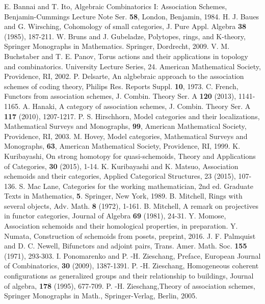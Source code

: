 \documentclass{amsart}
\theoremstyle{definition}
\theoremstyle{remark}
\begin{document}
\begin{thebibliography}{99}
%
 E. Bannai and T. Ito, Algebraic Combinatorics I: Association Schemes, Benjamin-Cummings Lecture Note Ser. {\bf 58}, 
London, Benjamin, 1984. 
%
 H. J. Baues and G. Wirsching,  
Cohomology of small categories, J. Pure Appl. Algebra {\bf 38} (1985), 187-211.
%
 W. Bruns and J. Gubeladze, Polytopes, rings, and K-theory, 
Springer Monographs in Mathematics. Springer, Dordrecht, 2009.
%
  V. M. Buchstaber and T. E.  Panov, 
Torus actions and their applications in topology and combinatorics. University Lecture Series, 24. 
American Mathematical Society, Providence, RI, 2002.
%
 P. Delsarte, An algbebraic approach to the association schemes of coding theory, 
Philips Res. Reports Suppl. {\bf 10}, 1973.  
%
 C. French, Functors from association schemes,  
J. Combin. Theory Ser. A {\bf 120} (2013), 1141-1165. 
%
 A. Hanaki,  A category of association schemes, J. Combin. Theory Ser. A {\bf 117} (2010), 1207-1217. 
%
 P. S. Hirschhorn, Model categories and their localizations, Mathematical Surveys and Monographs, 
{\bf 99}, American Mathematical Society, Providence, RI, 2003.
%
 M. Hovey, Model categories, Mathematical Surveys and Monographs, {\bf 63}, American Mathematical Society, Providence, RI, 1999.
%
 K. Kuribayashi, On strong homotopy for quasi-schemoids, Theory and Applications of Categories, 
{\bf 30} (2015), 1-14. 
%
 K. Kuribayashi and K. Matsuo, Association schemoids and their categories, 
Applied Categorical Structures, 23 (2015), 107-136.
%
 S. Mac Lane, Categories for the working mathematician, 2nd ed. 
Graduate Texts in Mathematics, {\bf 5}. Springer, New York, 1989.
%
 B. Mitchell, Rings with several objects, Adv. Math. {\bf 8} (1972), 1-161. 
%
 B. Mitchell, A remark on projectives in functor categories, Journal of Algebra {\bf 69} (1981), 24-31.
%
 Y. Momose, Association schemoids and their homological properties, in preparation. 
%
%
 Y. Numata, Construction of schemoids from posets, preprint, 2016.
%
 J. F. Palmquist and D. C. Newell, Bifunctors and adjoint pairs, Trans. Amer. Math. Soc. {\bf 155} (1971), 293-303.
%
 I. Ponomarenko and P. -H. Zieschang, Preface, European Journal of Combinatorics, {\bf 30} (2009), 1387-1391. 
%
 P. -H. Zieschang, Homogeneous coherent configurations as generalized groups and their relationship to buildings, Journal of algebra, 
{\bf 178} (1995), 677-709.  
%
 P. -H. Zieschang,Theory of association schemes, Springer Monographs in Math., 
Springer-Verlag, Berlin, 2005. 
\end{thebibliography}
\end{document}
